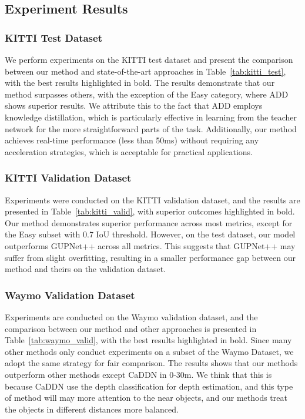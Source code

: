 \documentclass[journal]{IEEEtran}
\begin{document}
	\subsection{Experiment Results}
	\subsubsection{KITTI Test Dataset}
	We perform experiments on the KITTI test dataset and present the comparison between our method and state-of-the-art approaches in Table~\ref{tab:kitti_test}, with the best results highlighted in bold. The results demonstrate that our method surpasses others, with the exception of the Easy category, where ADD~\cite{add} shows superior results. We attribute this to the fact that ADD employs knowledge distillation, which is particularly effective in learning from the teacher network for the more straightforward parts of the task. Additionally, our method achieves real-time performance (less than 50ms) without requiring any acceleration strategies, which is acceptable for practical applications.
	
	\subsubsection{KITTI Validation Dataset}
	
	Experiments were conducted on the KITTI validation dataset, and the results are presented in Table~\ref{tab:kitti_valid}, with superior outcomes highlighted in bold. Our method demonstrates superior performance across most metrics, except for the Easy subset with 0.7 IoU threshold. However, on the test dataset, our model outperforms GUPNet++ across all metrics. This suggests that GUPNet++ may suffer from slight overfitting, resulting in a smaller performance gap between our method and theirs on the validation dataset.
	
	\subsubsection{Waymo Validation Dataset}
	
	Experiments are conducted on the Waymo validation dataset, and the comparison between our method and other approaches is presented in Table~\ref{tab:waymo_valid}, with the best results highlighted in bold. Since many other methods only conduct experiments on a subset of the Waymo Dataset, we adopt the same strategy for fair comparison. The results shows that our methods outperform other methods except CaDDN in 0-30m. We think that this is because CaDDN use the depth classification for depth estimation, and this type of method will may more attention to the near objects, and our methods treat the objects in different distances more balanced.
	
\end{document}
